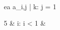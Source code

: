 \begin{eqcode}{e}{a }{}{}
  a_{i,j} | k: j = 1 \gets  %
  \begin{cases}
    5 & i: i < 1  & \otherwise \lend
  \end{cases} \lend
\end{eqcode}
